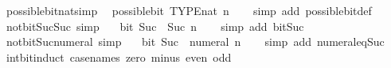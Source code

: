 \begin{isabellebody}
\isamarkupfalse%
\isanewline
\isanewline
{}\isamarkupfalse%
\ possible{\isacharunderscore}{\kern0pt}bit{\isacharunderscore}{\kern0pt}nat{\isacharbrackleft}{\kern0pt}simp{\isacharbrackright}{\kern0pt}{\isacharcolon}{\kern0pt}\isanewline
\ \ {\isachardoublequoteopen}possible{\isacharunderscore}{\kern0pt}bit\ TYPE{\isacharparenleft}{\kern0pt}nat{\isacharparenright}{\kern0pt}\ n{\isachardoublequoteclose}\isanewline
%
\isadelimproof
\ \ %
\endisadelimproof
%
\isatagproof
{}\isamarkupfalse%
\ {\isacharparenleft}{\kern0pt}simp\ add{\isacharcolon}{\kern0pt}\ possible{\isacharunderscore}{\kern0pt}bit{\isacharunderscore}{\kern0pt}def{\isacharparenright}{\kern0pt}%
\endisatagproof
{\isafoldproof}%
%
\isadelimproof
\isanewline
%
\endisadelimproof
\isanewline
{}\isamarkupfalse%
\ not{\isacharunderscore}{\kern0pt}bit{\isacharunderscore}{\kern0pt}Suc{\isacharunderscore}{\kern0pt}{}{\isacharunderscore}{\kern0pt}Suc\ {\isacharbrackleft}{\kern0pt}simp{\isacharbrackright}{\kern0pt}{\isacharcolon}{\kern0pt}\isanewline
\ \ {\isacartoucheopen}{\isasymnot}\ bit\ {\isacharparenleft}{\kern0pt}Suc\ {}{\isacharparenright}{\kern0pt}\ {\isacharparenleft}{\kern0pt}Suc\ n{\isacharparenright}{\kern0pt}{\isacartoucheclose}\isanewline
%
\isadelimproof
\ \ %
\endisadelimproof
%
\isatagproof
{}\isamarkupfalse%
\ {\isacharparenleft}{\kern0pt}simp\ add{\isacharcolon}{\kern0pt}\ bit{\isacharunderscore}{\kern0pt}Suc{\isacharparenright}{\kern0pt}%
\endisatagproof
{\isafoldproof}%
%
\isadelimproof
\isanewline
%
\endisadelimproof
\isanewline
{}\isamarkupfalse%
\ not{\isacharunderscore}{\kern0pt}bit{\isacharunderscore}{\kern0pt}Suc{\isacharunderscore}{\kern0pt}{}{\isacharunderscore}{\kern0pt}numeral\ {\isacharbrackleft}{\kern0pt}simp{\isacharbrackright}{\kern0pt}{\isacharcolon}{\kern0pt}\isanewline
\ \ {\isacartoucheopen}{\isasymnot}\ bit\ {\isacharparenleft}{\kern0pt}Suc\ {}{\isacharparenright}{\kern0pt}\ {\isacharparenleft}{\kern0pt}numeral\ n{\isacharparenright}{\kern0pt}{\isacartoucheclose}\isanewline
%
\isadelimproof
\ \ %
\endisadelimproof
%
\isatagproof
{}\isamarkupfalse%
\ {\isacharparenleft}{\kern0pt}simp\ add{\isacharcolon}{\kern0pt}\ numeral{\isacharunderscore}{\kern0pt}eq{\isacharunderscore}{\kern0pt}Suc{\isacharparenright}{\kern0pt}%
\endisatagproof
{\isafoldproof}%
%
\isadelimproof
\isanewline
%
\endisadelimproof
\isanewline
{}\isamarkupfalse%
\ int{\isacharunderscore}{\kern0pt}bit{\isacharunderscore}{\kern0pt}induct\ {\isacharbrackleft}{\kern0pt}case{\isacharunderscore}{\kern0pt}names\ zero\ minus\ even\ odd{\isacharbrackright}{\kern0pt}{\isacharcolon}{\kern0pt}\isanewline

\end{isabellebody}
